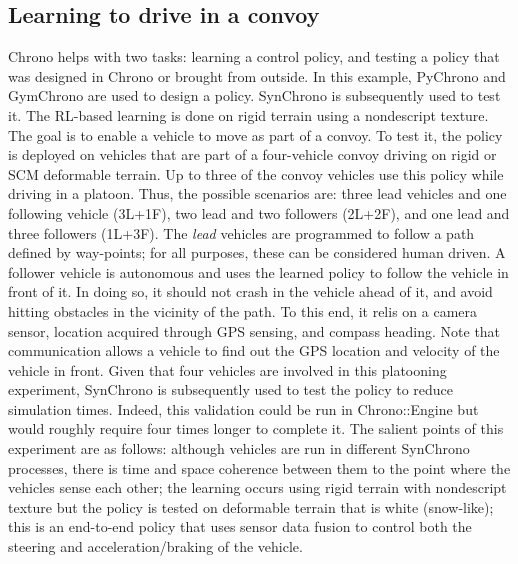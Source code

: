 \documentclass[12pt,twocolumn]{article}
\begin{document}
\subsection{Learning to drive in a convoy}
\label{subsec:learningDemo}


%  

Chrono helps with two tasks: learning a control policy, and testing a policy that was designed in Chrono or brought from outside. In this example, PyChrono and GymChrono are used to design a policy. SynChrono is subsequently used to test it. The RL-based learning is done on rigid terrain using a nondescript texture. The goal is to enable a vehicle to move as part of a convoy. To test it, the policy is deployed on vehicles that are part of a four-vehicle convoy driving on rigid or SCM deformable terrain. Up to three of the convoy vehicles use this policy while driving in a platoon. Thus, the possible scenarios are: three lead vehicles and one following vehicle (3L+1F), two lead and two followers (2L+2F), and one lead and three followers (1L+3F). The \textit{lead} vehicles are programmed to follow a path defined by way-points; for all purposes, these can be considered human driven. A follower vehicle is autonomous and uses the learned policy to follow the vehicle in front of it. In doing so, it should not crash in the vehicle ahead of it, and avoid hitting obstacles in the vicinity of the path. To this end, it relis on a camera sensor, location acquired through GPS sensing, and compass heading. Note that communication allows a vehicle to find out the GPS location and velocity of the vehicle in front. Given that four vehicles are involved in this platooning experiment, SynChrono is subsequently used to test the policy to reduce simulation times. Indeed, this validation could be run in Chrono::Engine but would roughly require four times longer to complete it. The salient points of this experiment are as follows: although vehicles are run in different SynChrono processes, there is time and space coherence between them to the point where the vehicles sense each other; the learning occurs using rigid terrain with nondescript texture but the policy is tested on deformable terrain that is white (snow-like); this is an end-to-end policy that uses sensor data fusion to control both the steering and acceleration/braking of the vehicle.
\end{document}
